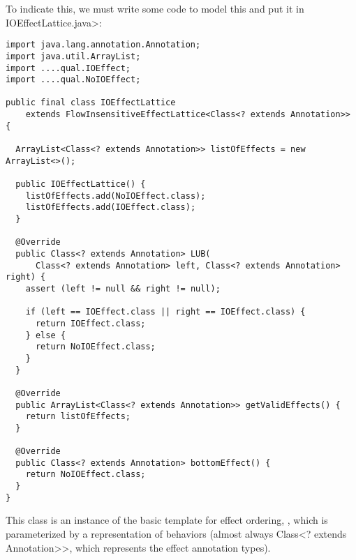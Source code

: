 To indicate this, we must write some code to model this and put it in \<IOEffectLattice.java>:
\begin{Verbatim}
import java.lang.annotation.Annotation;
import java.util.ArrayList;
import ....qual.IOEffect;
import ....qual.NoIOEffect;

public final class IOEffectLattice
    extends FlowInsensitiveEffectLattice<Class<? extends Annotation>> {

  ArrayList<Class<? extends Annotation>> listOfEffects = new ArrayList<>();

  public IOEffectLattice() {
    listOfEffects.add(NoIOEffect.class);
    listOfEffects.add(IOEffect.class);
  }

  @Override
  public Class<? extends Annotation> LUB(
      Class<? extends Annotation> left, Class<? extends Annotation> right) {
    assert (left != null && right != null);

    if (left == IOEffect.class || right == IOEffect.class) {
      return IOEffect.class;
    } else {
      return NoIOEffect.class;
    }
  }

  @Override
  public ArrayList<Class<? extends Annotation>> getValidEffects() {
    return listOfEffects;
  }

  @Override
  public Class<? extends Annotation> bottomEffect() {
    return NoIOEffect.class;
  }
}
\end{Verbatim}

This class is an instance of the basic template for effect ordering, , which is parameterized by a representation of behaviors (almost always \<Class<? extends Annotation>>, which represents the effect annotation types).

